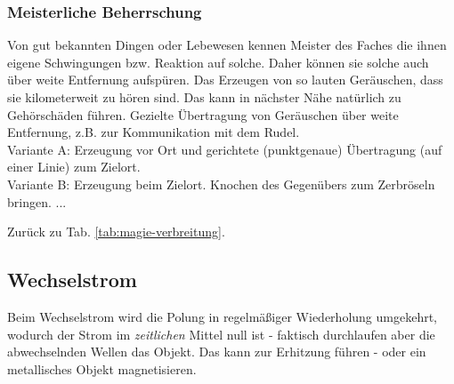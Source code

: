 \subsubsection{Meisterliche Beherrschung} 
\begin{outline}
	\1 Von gut bekannten Dingen oder Lebewesen kennen Meister des Faches die ihnen eigene Schwingungen bzw. Reaktion auf solche. 
	Daher können sie solche auch über weite Entfernung aufspüren.
	\1 Das Erzeugen von so lauten Geräuschen, dass sie kilometerweit zu hören sind. 
	Das kann in nächster Nähe natürlich zu Gehörschäden führen.
	\1 Gezielte Übertragung von Geräuschen über weite Entfernung, z.B. zur Kommunikation mit dem Rudel. \\ 
	Variante A: Erzeugung vor Ort und gerichtete (punktgenaue) Übertragung (auf einer Linie) zum Zielort. \\
	Variante B: Erzeugung beim Zielort.
	\1 Knochen des Gegenübers zum Zerbröseln bringen.
	\1 ...
\end{outline}
Zurück zu Tab. \ref{tab:magie-verbreitung}.



\subsection{Wechselstrom}\label{magie:wechselstrom}
Beim Wechselstrom wird die Polung in regelmäßiger Wiederholung umgekehrt, wodurch der Strom im \textit{zeitlichen} Mittel null ist - faktisch durchlaufen aber die abwechselnden Wellen das Objekt.
Das kann zur Erhitzung führen - oder ein metallisches Objekt magnetisieren.

